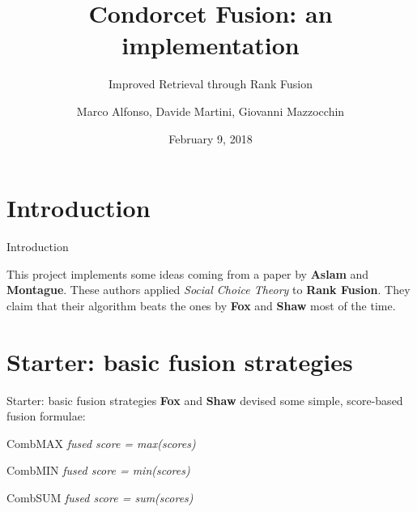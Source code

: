 \documentclass{beamer}
\title{Condorcet Fusion: an implementation}
\subtitle{Improved Retrieval through Rank Fusion}
\author{Marco Alfonso, Davide Martini, Giovanni Mazzocchin}
\date{February 9, 2018}
\begin{document}
	\maketitle



	\section{Introduction}

	\begin{frame}{Introduction}

		This project implements some ideas coming from a paper by 
                \newline \textbf {Aslam} and \textbf{Montague}. 
                \newline
                \newline
		These authors applied \textit{Social Choice Theory} to \textbf{Rank Fusion}. %
                \newline
                \newline
                They claim that their algorithm beats the ones by \textbf {Fox} and \textbf{Shaw}
                most of the time.
	\end{frame}


	\section{Starter: basic fusion strategies}

	\begin{frame}{Starter: basic fusion strategies}
                \textbf {Fox} and \textbf{Shaw} devised some simple, score-based fusion formulae:
		\begin{block}{CombMAX}
		       \textit{fused score = max(scores)} 
		\end{block}

		\begin{alertblock}{CombMIN}
		       \textit{fused score = min(scores)}   
		\end{alertblock}

		\begin{exampleblock}{CombSUM}
		       \textit{fused score = sum(scores)}  
		\end{exampleblock}
	\end{frame}
\end{document}
